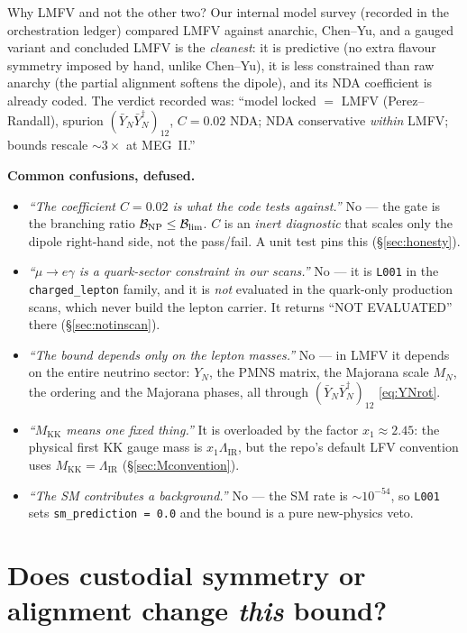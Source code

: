 \documentclass[11pt]{article}
\newenvironment{callout}[1]{%
  \par\medskip\begin{shaded}\noindent\textbf{#1}\par\smallskip}{\end{shaded}\medskip}
\newcommand{\MKK}{M_{\mathrm{KK}}}
\newcommand{\LIR}{\Lambda_{\mathrm{IR}}}
\newcommand{\YN}{Y_N}
\newcommand{\YNb}{\bar Y_N}
\newcommand{\spur}{(\YNb\YNb^\dagger)_{12}}
\newcommand{\BR}{\mathcal{B}}
\newcommand{\code}[1]{\texttt{#1}}
\theoremstyle{definition}
\begin{document}
Why LMFV and not the other two? Our internal model survey (recorded in the
orchestration ledger) compared LMFV against anarchic, Chen--Yu, and a gauged
variant and concluded LMFV is the \emph{cleanest}: it is predictive (no extra
flavour symmetry imposed by hand, unlike Chen--Yu), it is less constrained than
raw anarchy (the partial alignment softens the dipole), and its NDA coefficient
is already coded. The verdict recorded was: ``model locked $=$ LMFV
(Perez--Randall), spurion $\spur$, $C=0.02$ NDA; NDA conservative \emph{within}
LMFV; bounds rescale $\sim 3\times$ at MEG~II.''

\begin{callout}{Common confusions, defused.}
\begin{itemize}[leftmargin=1.2em,nosep]
\item[\textbf{A.}] \emph{``The coefficient $C=0.02$ is what the code tests
against.''} No --- the gate is the branching ratio $\BR_{\rm NP}\le\BR_{\rm lim}$.
$C$ is an \emph{inert diagnostic} that scales only the dipole right-hand side, not
the pass/fail. A unit test pins this (\S\ref{sec:honesty}).
\item[\textbf{B.}] \emph{``$\mu\to e\gamma$ is a quark-sector constraint in our
scans.''} No --- it is \code{L001} in the \code{charged\_lepton} family, and it is
\emph{not} evaluated in the quark-only production scans, which never build the
lepton carrier. It returns ``NOT EVALUATED'' there (\S\ref{sec:notinscan}).
\item[\textbf{C.}] \emph{``The bound depends only on the lepton masses.''} No ---
in LMFV it depends on the entire neutrino sector: $\YN$, the PMNS matrix, the
Majorana scale $M_N$, the ordering and the Majorana phases, all through
$\spur$ \eqref{eq:YNrot}.
\item[\textbf{D.}] \emph{``$\MKK$ means one fixed thing.''} It is overloaded by
the factor $x_1\approx 2.45$: the physical first KK gauge mass is
$x_1\LIR$, but the repo's default LFV convention uses $\MKK=\LIR$
(\S\ref{sec:Mconvention}).
\item[\textbf{E.}] \emph{``The SM contributes a background.''} No --- the SM rate
is $\sim 10^{-54}$, so \code{L001} sets \code{sm\_prediction = 0.0} and the bound
is a pure new-physics veto.
\end{itemize}
\end{callout}

\section{Does custodial symmetry or alignment change \emph{this} bound?}
\label{sec:custodial}
\end{document}
